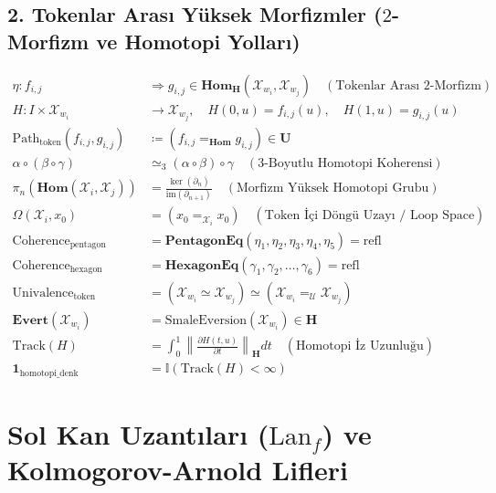 \documentclass[11pt, a4paper]{article}
\begin{document}
\subsection{2. Tokenlar Arası Yüksek Morfizmler ($2$-Morfizm ve Homotopi Yolları)}
\begin{align}
\eta : f_{i,j} &\Longrightarrow g_{i,j} \in \mathbf{Hom}_{\mathbf{H}}(\mathcal{X}_{w_i}, \mathcal{X}_{w_j}) \quad (\text{Tokenlar Arası $2$-Morfizm}) \\
H : I \times \mathcal{X}_{w_i} &\longrightarrow \mathcal{X}_{w_j}, \quad H(0, u) = f_{i,j}(u), \quad H(1, u) = g_{i,j}(u) \\
\text{Path}_{\text{token}}(f_{i,j}, g_{i,j}) &\coloneqq (f_{i,j} =_{\mathbf{Hom}} g_{i,j}) \in \mathbf{U} \\
\alpha \circ (\beta \circ \gamma) &\simeq_{3} (\alpha \circ \beta) \circ \gamma \quad (\text{$3$-Boyutlu Homotopi Koherensi}) \\
\pi_n(\mathbf{Hom}(\mathcal{X}_i, \mathcal{X}_j)) &= \frac{\ker(\partial_n)}{\text{im}(\partial_{n+1})} \quad (\text{Morfizm Yüksek Homotopi Grubu}) \\
\Omega(\mathcal{X}_i, x_0) &= (x_0 =_{\mathcal{X}_i} x_0) \quad (\text{Token İçi Döngü Uzayı / Loop Space}) \\
\text{Coherence}_{\text{pentagon}} &= \mathbf{PentagonEq}(\eta_1, \eta_2, \eta_3, \eta_4, \eta_5) = \text{refl} \\
\text{Coherence}_{\text{hexagon}} &= \mathbf{HexagonEq}(\gamma_1, \gamma_2, \dots, \gamma_6) = \text{refl} \\
\text{Univalence}_{\text{token}} &= (\mathcal{X}_{w_i} \simeq \mathcal{X}_{w_j}) \simeq (\mathcal{X}_{w_i} =_{\mathcal{U}} \mathcal{X}_{w_j}) \\
\mathbf{Evert}(\mathcal{X}_{w_i}) &= \text{SmaleEversion}(\mathcal{X}_{w_i}) \in \mathbf{H} \\
\text{Track}(H) &= \int_0^1 \left\| \frac{\partial H(t, u)}{\partial t} \right\|_{\mathbf{H}} dt \quad (\text{Homotopi İz Uzunluğu}) \\
\mathbf{1}_{\text{homotopi\_denk}} &= \mathbb{I}\left( \text{Track}(H) < \infty \right)
\end{align}

\section{Sol Kan Uzantıları ($\text{Lan}_f$) ve Kolmogorov-Arnold Lifleri}
\end{document}
